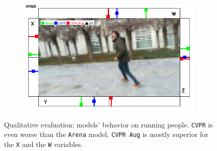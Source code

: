 \begin{figure}[H]
\begin{center}
\begin{subfigure}[h]{0.49\textwidth}
		\end{subfigure}
		\hfill
		\begin{subfigure}[h]{0.49\textwidth}
			\centering
			\includegraphics[width=0.98\textwidth]{"contents/images/qualitative-videos/running1-square02-7323"}
		\end{subfigure}
	\end{center}
	\vspace{-0.5cm}
	\caption[Qualitative evaluation: models' behavior on running people]{Qualitative evaluation: models' behavior on running people. \texttt{CVPR} is even worse than the \texttt{Arena} model. \texttt{CVPR Aug} is mostly superior for the \texttt{X} and the \texttt{W} variables.}
	\label{fig:ql-sim-run}
\end{figure}

